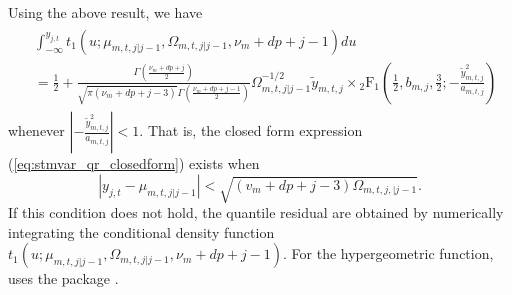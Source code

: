 \documentclass[nojss]{jss} %
\begin{document}
\begin{appendix}
Using the above result, we have
\begin{align}\label{eq:stmvar_qr_closedform}
\begin{aligned}
&\int_{-\infty}^{y_{j,t}}t_1(u;\mu_{m,t,j|j-1},\Omega_{m,t,j|j-1},\nu_m + dp + j - 1)du \\
&= \frac{1}{2} + \frac{\Gamma\left(\frac{\nu_m + dp + j}{2}\right)}{\sqrt{\pi (\nu_m + dp + j - 3)}\Gamma\left(\frac{\nu_m + dp + j - 1}{2} \right)}\Omega_{m,t,j|j-1}^{-1/2}\tilde{y}_{m,t,j} \times {}_2\text{F}_1\left(\frac{1}{2}, b_{m,j}, \frac{3}{2}; -\frac{\tilde{y}_{m,t,j}^2}{a_{m,t,j}} \right)
\end{aligned}
\end{align}
whenever $\left|-\frac{\tilde{y}_{m,t,j}^2}{a_{m,t,j}}\right|<1$.  That is,  the closed form expression (\ref{eq:stmvar_qr_closedform}) exists when
\begin{equation}
|y_{j,t} - \mu_{m,t,j|j-1}| < \sqrt{(v_m + dp + j - 3)\Omega_{m,t,j,|j-1}}.
\end{equation}
If this condition does not hold, the quantile residual are obtained by numerically integrating the conditional density function $t_1(u;\mu_{m,t,j|j-1},\Omega_{m,t,j|j-1},\nu_m + dp + j - 1)$. For the hypergeometric function,  uses the package  \citep{gsl}.



\end{appendix}
\end{document}
